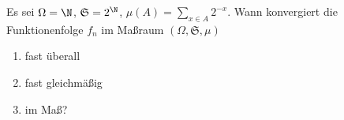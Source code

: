 
\begin{exercise}

Es sei $\Omega = \N$, $\mathfrak{S} = 2^\N$, $\mu(A) = \sum_{x \in A} 2^{-x}$. Wann konvergiert die Funktionenfolge $f_n$ im Maßraum $(\Omega, \mathfrak{S}, \mu)$

\begin{enumerate}[label = (\alph*)]

  \item
  fast überall
  
  \item
  fast gleichmäßig
  
  \item
  im Maß?

\end{enumerate}

\end{exercise}


